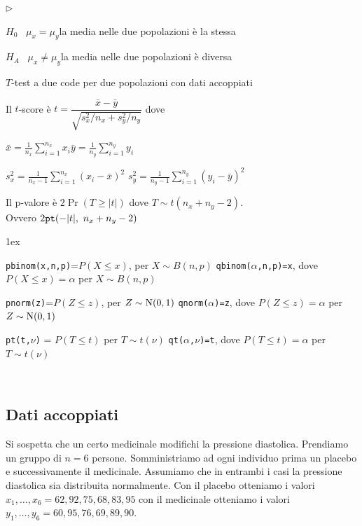 \documentclass[11pt,openany]{book}
\newcommand{\mylabel}[1]{{\footnotesize\textsf{#1}}\hfill}
\renewenvironment{itemize}
  {\begin{list}{$\triangleright$}{%
   \setlength{\parskip}{0mm}
   \setlength{\topsep}{.2\baselineskip}
   \setlength{\rightmargin}{0mm}
   \setlength{\listparindent}{0mm}
   \setlength{\itemindent}{0mm}
   \setlength{\labelwidth}{3ex}
   \setlength{\itemsep}{.4\baselineskip}
   \setlength{\parsep}{0mm}
   \setlength{\partopsep}{0mm}
   \setlength{\labelsep}{1ex}
   \setlength{\leftmargin}{\labelwidth+\labelsep}
   \let\makelabel\mylabel}}{%
   \end{list}\vspace*{-1.3mm}}
\begin{document}
\begin{itemize}
\item[1.] $H_0$ \ $\mu_x = \mu_y$\hfill la media nelle due popolazioni è la stessa 

\item[2.] $H_A$ \ $\mu_x\neq\mu_y$\hfill la media nelle due popolazioni è diversa 


\item[3.] $T$-test a due code per due popolazioni con dati accoppiati

\item[3.] Il $t$-score è 
$t = \dfrac{\bar x - \bar y}{\sqrt{s^2_x/n_x+s^2_y/n_y}}$ dove 

$\displaystyle\bar x = \frac1{n_x}\sum^{n_x}_{i=1}x_i$\hfil$\displaystyle\bar y = \frac1{n_y}\sum^{n_y}_{i=1}y_i$


$\displaystyle s^2_x= \frac1{n_x-1}\sum^{n_x}_{i=1}(x_i-\bar x)^2$\hfil
$\displaystyle s^2_y= \frac1{n_y-1}\sum^{n_y}_{i=1}(y_i-\bar y)^2$




\item[4.] Il p-valore è $2\Pr(T\ge |t|)$ dove $T\sim t(n_x+n_y-2)$.\\ 
Ovvero $2 {\tt  pt}(-|t|,\  n_x+n_y-2)$
\end{itemize}


\vfill
\parskip1ex
{\hrulefill\scriptsize


{\tt pbinom(x,n,p)}=$P(X\le x)$, per $X\sim B(n,p)$
\hfill 
{\tt qbinom($\alpha$,n,p)=x},  dove $P(X\le x)=\alpha$ per $X\sim B(n,p)$

{\tt pnorm(z)}=$P(Z\le z)$, per $Z\sim {\rm N}(0,1)$
\hfill 
{\tt qnorm($\alpha$)=z},  dove $P(Z\le z)=\alpha$ per $Z\sim {\rm N}(0,1)$

{\tt pt(t,$\nu$)} = $P(T\le t)$ per $T\sim t(\nu)$
\hfill
{\tt qt($\alpha$,$\nu$)=t}, dove $P(T\le t)=\alpha$ per $T\sim t(\nu)$

}


\clearpage\
\subsection{Dati accoppiati}

Si sospetta che un certo medicinale modifichi la pressione diastolica.  Prendiamo un gruppo di $n=6$ persone. Somministriamo ad ogni individuo prima un placebo e successivamente il medicinale. Assumiamo che in entrambi i casi la pressione diastolica sia distribuita normalmente. Con il placebo otteniamo i valori $x_1,\dots,x_6=62,92,75,68,83,95$ con il medicinale otteniamo i valori $y_1,\dots,y_6=60,95,76,69,89,90$.
\end{document}
